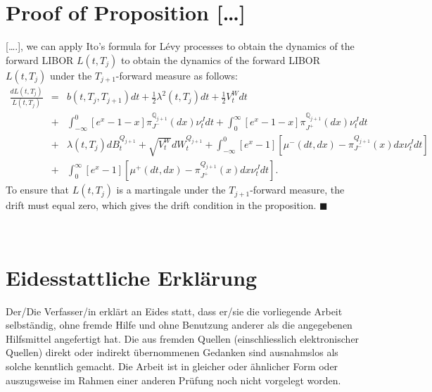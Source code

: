 \documentclass[11pt,a4paper,english,oneside]{book}
\begin{document}
\section{Proof of Proposition [\dots]\label{sec:proof_prop1}}
[\dots.], we can apply Ito's formula for Lévy processes   to obtain the
dynamics of the forward LIBOR \(L(t,T_j)\) to obtain the
dynamics of the forward LIBOR \(L(t,T_j)\) under the \(T_{j+1}\)-forward measure
as follows:
\begin{eqnarray}
\frac{dL(t,T_j)}{L(t,T_j)} &=& b (t,T_{j},T_{j+1}) dt +
\frac{1}{2} \lambda ^2(t,T_j) dt +
\frac{1}{2} V _t^W dt\nonumber \\
&+& \int_{-\infty}^{0}  \left[ e^{x}-1-x \right]
\pi_{J^-}^{\mathbb Q_{j+1}}(dx)\nu _t^J dt + \int_{0}^{\infty} \left[
e^{x}-1-x \right] \pi_{J^+}^{\mathbb Q_{j+1}}(dx)\nu _t^J dt \nonumber \\
&+& \lambda (t,T_j) dB_{t}^{Q_{j+1}}+ \sqrt{ V _t^W}
dW_{t}^{Q_{j+1}}+ \int_{-\infty}^{0} \left[ e^{ x}-1 \right]
\left[ \mu^- (dt,dx) -
\pi_{J^-}^{Q_{j+1}}(x) dx \nu _t^J dt \right]\nonumber \\
&+& \int_{0}^{\infty} \left[ e^{ x}-1 \right] \left[ \mu ^+ (dt,dx)
- \pi_{J^+}^{Q_{j+1}}(x) dx \nu _t^J dt \right].\label{eq:app_eq}
\end{eqnarray}
To ensure that \(L(t,T_j)\) is a martingale under the
\(T_{j+1}\)-forward measure, the drift must equal zero, which gives the
drift condition in the proposition. \(\blacksquare\)

\printbibliography\

\newpage


%
\thispagestyle{firststyle}

\section*{Eidesstattliche Erklärung}
Der/Die Verfasser/in erklärt an Eides statt, dass er/sie die vorliegende Arbeit selbständig, ohne fremde Hilfe und ohne Benutzung anderer als die angegebenen Hilfsmittel angefertigt hat. Die aus fremden Quellen (einschliesslich elektronischer Quellen) direkt oder indirekt übernommenen Gedanken sind ausnahmslos als solche kenntlich gemacht. Die Arbeit ist in gleicher oder ähnlicher Form oder auszugsweise im Rahmen einer anderen Prüfung noch nicht vorgelegt worden.\\[2cm]
 \hfill {}
\end{document}

